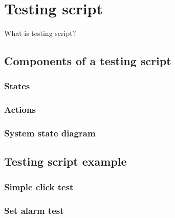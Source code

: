 \chapter{Testing script}
What is testing script?

\section{Components of a testing script}
\subsection{States}

\subsection{Actions}

\subsection{System state diagram}

\section{Testing script example}
\subsection{Simple click test}

\subsection{Set alarm test}